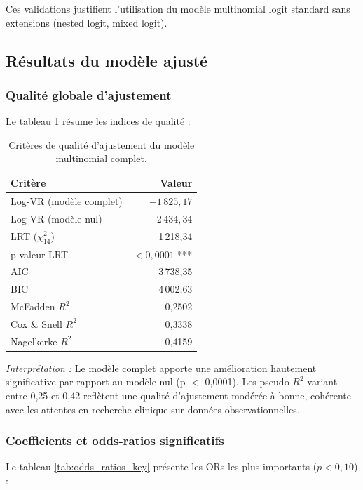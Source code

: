 \documentclass[12pt,a4paper]{article}
\begin{document}
Ces validations justifient l'utilisation du modèle multinomial logit standard sans extensions (nested logit, mixed logit).

\subsection{Résultats du modèle ajusté}

\subsubsection{Qualité globale d'ajustement}

Le tableau \ref{tab:qualite_ajustement} résume les indices de qualité :

\begin{table}[H]
\centering
\caption{Critères de qualité d'ajustement du modèle multinomial complet.}
\label{tab:qualite_ajustement}
\begin{tabular}{@{}lr@{}}
\toprule
\textbf{Critère} & \textbf{Valeur} \\
\midrule
Log-VR (modèle complet) & $-1\,825{,}17$ \\
Log-VR (modèle nul) & $-2\,434{,}34$ \\
LRT ($\chi^2_{14}$) & 1\,218{,}34 \\
p-valeur LRT & $< 0{,}0001$ *** \\
\midrule
AIC & 3\,738{,}35 \\
BIC & 4\,002{,}63 \\
\midrule
McFadden $R^2$ & 0{,}2502 \\
Cox \& Snell $R^2$ & 0{,}3338 \\
Nagelkerke $R^2$ & 0{,}4159 \\
\bottomrule
\end{tabular}
\end{table}

\textit{Interprétation :} Le modèle complet apporte une amélioration hautement significative par rapport au modèle nul (p $<$ 0{,}0001). Les pseudo-$R^2$ variant entre 0{,}25 et 0{,}42 reflètent une qualité d'ajustement modérée à bonne, cohérente avec les attentes en recherche clinique sur données observationnelles.

\subsubsection{Coefficients et odds-ratios significatifs}

Le tableau \ref{tab:odds_ratios_key} présente les ORs les plus importants ($p < 0{,}10$) :
\end{document}
